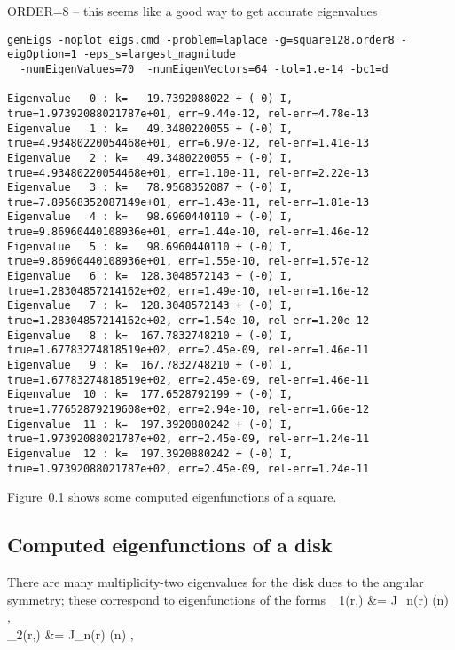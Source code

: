 \mni 
ORDER=8 -- this seems like a good way to get accurate eigenvalues
\begin{Verbatim}[fontsize=\footnotesize]
genEigs -noplot eigs.cmd -problem=laplace -g=square128.order8 -eigOption=1 -eps_s=largest_magnitude 
  -numEigenValues=70  -numEigenVectors=64 -tol=1.e-14 -bc1=d 

Eigenvalue   0 : k=   19.7392088022 + (-0) I,  true=1.97392088021787e+01, err=9.44e-12, rel-err=4.78e-13
Eigenvalue   1 : k=   49.3480220055 + (-0) I,  true=4.93480220054468e+01, err=6.97e-12, rel-err=1.41e-13
Eigenvalue   2 : k=   49.3480220055 + (-0) I,  true=4.93480220054468e+01, err=1.10e-11, rel-err=2.22e-13
Eigenvalue   3 : k=   78.9568352087 + (-0) I,  true=7.89568352087149e+01, err=1.43e-11, rel-err=1.81e-13
Eigenvalue   4 : k=   98.6960440110 + (-0) I,  true=9.86960440108936e+01, err=1.44e-10, rel-err=1.46e-12
Eigenvalue   5 : k=   98.6960440110 + (-0) I,  true=9.86960440108936e+01, err=1.55e-10, rel-err=1.57e-12
Eigenvalue   6 : k=  128.3048572143 + (-0) I,  true=1.28304857214162e+02, err=1.49e-10, rel-err=1.16e-12
Eigenvalue   7 : k=  128.3048572143 + (-0) I,  true=1.28304857214162e+02, err=1.54e-10, rel-err=1.20e-12
Eigenvalue   8 : k=  167.7832748210 + (-0) I,  true=1.67783274818519e+02, err=2.45e-09, rel-err=1.46e-11
Eigenvalue   9 : k=  167.7832748210 + (-0) I,  true=1.67783274818519e+02, err=2.45e-09, rel-err=1.46e-11
Eigenvalue  10 : k=  177.6528792199 + (-0) I,  true=1.77652879219608e+02, err=2.94e-10, rel-err=1.66e-12
Eigenvalue  11 : k=  197.3920880242 + (-0) I,  true=1.97392088021787e+02, err=2.45e-09, rel-err=1.24e-11
Eigenvalue  12 : k=  197.3920880242 + (-0) I,  true=1.97392088021787e+02, err=2.45e-09, rel-err=1.24e-11

\end{Verbatim}



Figure~\ref{} shows some computed eigenfunctions of a square.


\subsection{Computed eigenfunctions of a disk}


There are many multiplicity-two eigenvalues for the disk dues to the angular symmetry; 
these correspond to eigenfunctions
of the forms
\ba
     \phi_1(r,\theta) &= J_n(\kappa r) \cos(n\theta) , \\
     \phi_2(r,\theta) &= J_n(\kappa r) \sin(n\theta) ,
\ea


